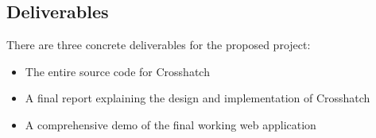 \documentclass{article}
\begin{document}



\subsection{Deliverables}
There are three concrete deliverables for the proposed project:
\begin{itemize}
  \item The entire source code for Crosshatch
  \item A final report explaining the design and implementation of Crosshatch
  \item A comprehensive demo of the final working web application
\end{itemize}
\end{document}

